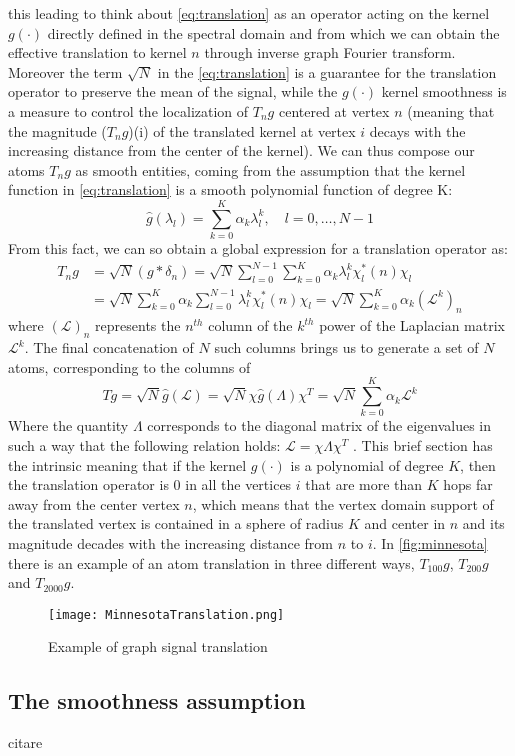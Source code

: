 this leading to think about \ref{eq:translation} as an operator acting on the kernel $g(\cdot)$ directly defined in the spectral domain and from which we can obtain the effective translation to kernel $n$ through inverse graph Fourier transform. Moreover the term $\sqrt{N}$ in the \autoref{eq:translation} is a guarantee for the translation operator to preserve the mean of the signal, while the $g(\cdot)$ kernel smoothness is a measure to control the localization of $T_n g$ centered at vertex $n$ (meaning that the magnitude ($T_n g$)(i) of the translated kernel at vertex $i$ decays with the increasing distance from the center of the kernel). We can thus compose our atoms $T_n g$ as smooth entities, coming from the assumption that the kernel function in \ref{eq:translation} is a smooth polynomial function of degree K:
\begin{equation}
\hat{g}(\lambda_l) = \sum_{k=0}^{K} \alpha_k\lambda_l^k, \quad l = 0,\dots,N-1
\end{equation}
From this fact, we can so obtain a global expression for a translation operator as:
\begin{align}
T_n g & = \sqrt{N}(g * \delta_n) = \sqrt{N}\sum_{l=0}^{N-1}\sum_{k=0}^{K}\alpha_k\lambda_l^k\chi_l^*(n)\chi_l \\
&= \sqrt{N}\sum_{k=0}^{K}\alpha_k\sum_{l=0}^{N-1}\lambda_l^k\chi_l^*(n)\chi_l = \sqrt{N}\sum_{k=0}^{K}\alpha_k (\mathcal{L}^k)_n
\end{align}
where $(\mathcal{L})_n$ represents the $n^{th}$ column of the $k^{th}$ power of the Laplacian matrix $\mathcal{L}^k$. The final concatenation of $N$ such columns brings us to generate a set of $N$ atoms, corresponding to the columns of
\begin{equation}
Tg = \sqrt{N}\hat{g}(\mathcal{L}) = \sqrt{N}\chi \hat{g}(\Lambda)\chi^T = \sqrt{N}\sum_{k=0}^{K}\alpha_k\mathcal{L}^k
\label{eq:tg}
\end{equation}
Where the quantity $\Lambda$ corresponds to the diagonal matrix of the eigenvalues in such a way that the following relation holds: $\mathcal{L} = \chi \Lambda \chi^T$ \cite{Dong2016}. This brief section has the intrinsic meaning that if the kernel $g(\cdot)$ is a polynomial of degree $K$, then the translation operator is $0$ in all the vertices $i$ that are more than $K$ hops far away from the center vertex $n$, which means that the vertex domain support of the translated vertex is contained in a sphere of radius $K$ and center in $n$ and its magnitude decades with the increasing distance from $n$ to $i$.
In \autoref{fig:minnesota} there is an example of an atom translation in three different ways, $T_{100}g$, $T_{200}g$ and $T_{2000}g$.

\begin{figure}
\centering
\texttt{[image: MinnesotaTranslation.png]}
\caption{Example of graph signal translation}
\label{fig:minnesota}
\end{figure}

\subsection{The smoothness assumption}
citare \cite{Shuman2016}
